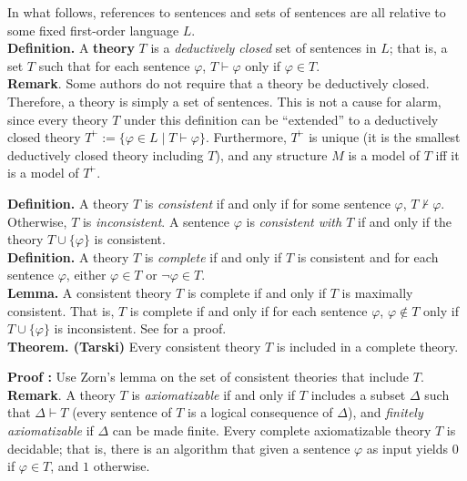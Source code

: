 \documentclass[12pt]{article}
\begin{document}
In what follows, references to sentences and sets of sentences are
all relative to some fixed first-order language $L$. \\

\textbf{Definition.} A \textbf{theory} $T$ is a \emph{deductively
closed} set of sentences in $L$; that is, a set $T$ such that for each
sentence $\varphi$, $T \vdash \varphi$ only if $\varphi \in
T$.\\

\textbf{Remark}.  Some authors do not require that a theory be deductively closed.  Therefore, a theory is simply a set of sentences.  This is not a cause for alarm, since every theory $T$ under this definition can be ``extended'' to a deductively closed theory $T^{\vdash}:=\lbrace \varphi \in L\mid T\vdash \varphi\rbrace$.  Furthermore, $T^{\vdash}$ is unique (it is the smallest deductively closed theory including $T$), and any structure $M$ is a model of $T$ iff it is a model of $T^{\vdash}$.

\textbf{Definition.} A theory $T$ is \emph{consistent} if and only
if for some sentence $\varphi$, $T \not \vdash \varphi$.
Otherwise, $T$ is \emph{inconsistent}. A sentence
$\varphi$ is \emph{consistent with $T$} if and only if the
theory $T \cup \lbrace \varphi \rbrace$ is consistent.\\

\textbf{Definition.} A theory $T$ is \emph{complete} if and only
if $T$ is consistent and for each sentence $\varphi$, either $\varphi \in T$
or $\neg \varphi \in T$.\\

\textbf{Lemma.} A consistent theory $T$ is complete if and only if $T$ is
maximally consistent. That is, $T$ is complete if and only if for
each sentence $\varphi$, $\varphi \not \in T$ only if
$T \cup \lbrace \varphi \rbrace$ is inconsistent.  See  for a proof. \\

\textbf{Theorem. (Tarski)} Every consistent theory $T$ is included
in a complete theory.

\textbf{Proof :} Use Zorn's lemma on the set of consistent
theories that include $T$.\\

\textbf{Remark}. A theory $T$ is \emph{axiomatizable} if and only
if $T$ includes a  subset $\Delta$ such that $\Delta
\vdash T$ (every sentence of $T$ is a logical consequence of
$\Delta$), and \emph{finitely axiomatizable} if $\Delta$ can be made finite. Every complete axiomatizable theory $T$ is decidable;
that is, there is an algorithm that given a sentence $\varphi$ as
input yields $0$ if $\varphi \in T$, and $1$ otherwise.

\end{document}
